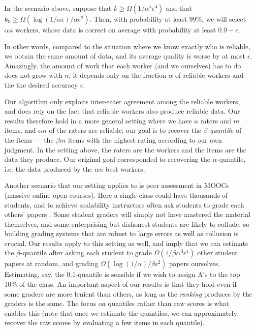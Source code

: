 

\begin{theorem}
\label{thm:intro}
In the scenario above, suppose that $k \geq \Omega(1/\alpha^4\epsilon^4)$
and that $k_0 \geq \Omega(\log(1/\alpha\epsilon)/\alpha\epsilon^2)$. Then, with probability 
at least $99\%$, we will select $\alpha n$ workers, whose data is correct on 
average with probability at least $0.9-\epsilon$.
\end{theorem}
In other words, compared to the situation where we know exactly who is reliable, 
we obtain the same amount of data, and its average quality is worse by at most 
$\epsilon$. Amazingly, the amount of work that each worker (and we ourselves) has 
to do does not grow with $n$; it depends only on the fraction $\alpha$ of 
reliable workers and the the desired accuracy $\epsilon$.

Our algorithm only exploits inter-rater agreement among the reliable workers, 
and does rely on the fact that reliable workers also produce reliable data.
Our results therefore hold in a more general setting where we have $n$ raters and 
$m$ items, and $\alpha n$ of the raters are reliable; our goal is to 
recover the \emph{$\beta$-quantile} of the items --- the $\beta m$ items 
with the highest rating according to our own judgment. In the setting above, 
the raters are the workers and the items are the data they produce. Our original 
goal corresponded to recovering the $\alpha$-quantile, i.e. the data 
produced by the $\alpha n$ best workers.

Another scenario that our setting applies to is peer assessment in MOOCs (massive 
online open courses). Here a single class could have thousands of students, 
and to achieve scalability instructors often ask students to grade each others' 
papers \citep{kulkarni2015peer,piech2013tuned}. 
Some student graders will simply not have mastered the material themselves, 
and some enterprising but dishonest students are likely to collude, 
so building grading systems that are robust to large errors as well as 
collusion is crucial. 
Our results apply to this setting as well, and imply that we can estimate the 
$\beta$-quantile after asking each student to grade 
$\Omega(1/\beta\alpha^3\epsilon^4)$ other student papers at random, and 
grading $\Omega(\log(1/\alpha)/\beta\epsilon^2)$ papers ourselves.
Estimating, say, the $0.1$-quantile is 
sensible if we wish to assign A's to the top $10\%$ of the class. 
An important aspect of our results is that they hold even if some graders are 
more lenient than others, as long as the \emph{ranking} produces by the graders 
is the same. The focus on quantiles rather than raw scores is what enables this 
(note that once we estimate the quantiles, we can approximately recover the 
raw scores by evaluating a few items in each quantile).

